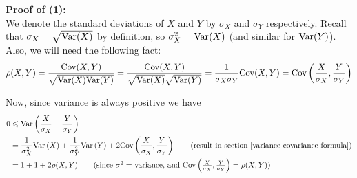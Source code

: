 \noindent \textbf{Proof of (1):} \\
We denote the standard deviations of $X$ and $Y$ by $\sigma_X$ and $\sigma_Y$ respectively. Recall that $\sigma_X = \sqrt{\text{Var}(X)}$ by definition, so $\sigma_X^2 = \text{Var}(X)$ (and similar for $\text{Var}(Y)$). Also, we will need the following fact:
\[
\rho(X,Y) = \frac{\text{Cov}(X,Y)}{\sqrt{\text{Var}(X)\text{Var}(Y)}} = \frac{\text{Cov}(X,Y)}{\sqrt{\text{Var}(X)}\sqrt{\text{Var}(Y)}} = \frac{1}{\sigma_X\sigma_Y}\text{Cov}(X,Y) = \text{Cov}\left(\frac{X}{\sigma_X},\frac{Y}{\sigma_Y}\right)
\]

\noindent Now, since variance is always positive we have
\begin{align*}
0 & \leq \Var\brac{\frac{X}{\sigma_X} + \frac{Y}{\sigma_Y}} \\
	& =\frac{1}{\sigma_X^2} \Var\brac{X} + \frac{1}{\sigma_Y^2}\Var\brac{Y} + 2\Cov\brac{\frac{X}{\sigma_X},\frac{Y}{\sigma_Y}} \tag{result in section \ref{variance covariance formula}} \\ 
	& = 1 + 1 + 2\rho(X,Y) \tag{since $\sigma^2 =$ variance, and $\Cov\brac{\frac{X}{\sigma_X},\frac{Y}{\sigma_Y}} = \rho(X,Y)$}
\end{align*}



































